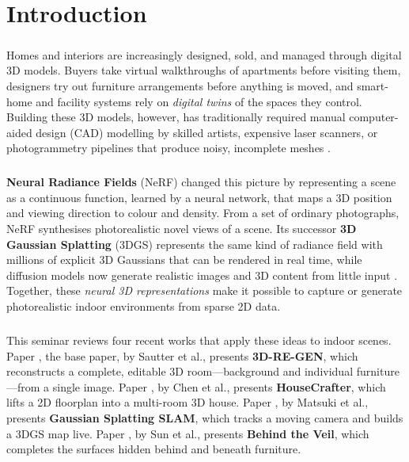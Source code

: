 \documentclass[12pt,a4paper,final]{extreport}
\begin{document}
\setcounter{page}{1}


\chapter{Introduction}

\paragraph{} Homes and interiors are increasingly designed, sold, and managed through digital 3D models. Buyers take virtual walkthroughs of apartments before visiting them, designers try out furniture arrangements before anything is moved, and smart-home and facility systems rely on \emph{digital twins} of the spaces they control. Building these 3D models, however, has traditionally required manual computer-aided design (CAD) modelling by skilled artists, expensive laser scanners, or photogrammetry pipelines that produce noisy, incomplete meshes \cite{p1,p2}.

\paragraph{} \textbf{Neural Radiance Fields} (NeRF) \cite{mildenhall2020} changed this picture by representing a scene as a continuous function, learned by a neural network, that maps a 3D position and viewing direction to colour and density. From a set of ordinary photographs, NeRF synthesises photorealistic novel views of a scene. Its successor \textbf{3D Gaussian Splatting} (3DGS) \cite{kerbl2023} represents the same kind of radiance field with millions of explicit 3D Gaussians that can be rendered in real time, while diffusion models now generate realistic images and 3D content from little input \cite{rombach2022}. Together, these \emph{neural 3D representations} make it possible to capture or generate photorealistic indoor environments from sparse 2D data.

\paragraph{} This seminar reviews four recent works that apply these ideas to indoor scenes. Paper \cite{p1}, the base paper, by Sautter et al., presents \textbf{3D-RE-GEN}, which reconstructs a complete, editable 3D room---background and individual furniture---from a single image. Paper \cite{p2}, by Chen et al., presents \textbf{HouseCrafter}, which lifts a 2D floorplan into a multi-room 3D house. Paper \cite{p3}, by Matsuki et al., presents \textbf{Gaussian Splatting SLAM}, which tracks a moving camera and builds a 3DGS map live. Paper \cite{p4}, by Sun et al., presents \textbf{Behind the Veil}, which completes the surfaces hidden behind and beneath furniture.
\end{document}
